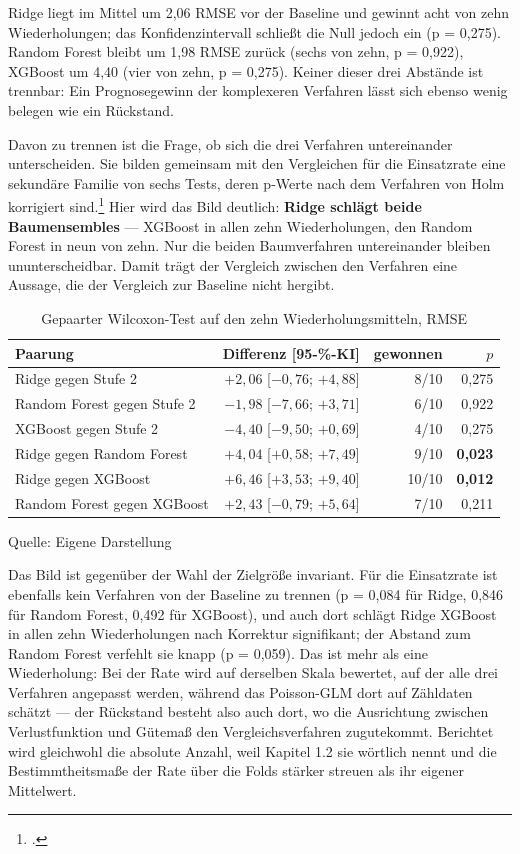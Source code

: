 \documentclass[12pt,a4paper]{article}
\renewcommand{\footnotesize}{\fontsize{10pt}{12pt}\selectfont}
\newcommand{\tabformat}{%
  \centering
  \singlespacing
  \footnotesize
  \setlength{\tabcolsep}{5pt}%
  \renewcommand{\arraystretch}{1.15}%
}
\newcommand{\tabquelle}[1][Eigene Darstellung]{%
  \par\setlength{\parskip}{0pt}\vspace{3pt}%
  {\setstretch{1}\fontsize{9pt}{11pt}\selectfont\raggedright Quelle: #1\par}%
}
\begin{document}
Ridge liegt im Mittel um 2,06 RMSE vor der Baseline und gewinnt acht von zehn Wiederholungen; das Konfidenzintervall schließt die Null jedoch ein (p = 0,275). Random Forest bleibt um 1,98 RMSE zurück (sechs von zehn, p = 0,922), XGBoost um 4,40 (vier von zehn, p = 0,275). Keiner dieser drei Abstände ist trennbar: Ein Prognosegewinn der komplexeren Verfahren lässt sich ebenso wenig belegen wie ein Rückstand.
 
Davon zu trennen ist die Frage, ob sich die drei Verfahren untereinander unterscheiden. Sie bilden gemeinsam mit den Vergleichen für die Einsatzrate eine sekundäre Familie von sechs Tests, deren p-Werte nach dem Verfahren von Holm korrigiert sind.\footcite[]{Holm1979} Hier wird das Bild deutlich: \textbf{Ridge schlägt beide Baumensembles} --- XGBoost in allen zehn Wiederholungen, den Random Forest in neun von zehn. Nur die beiden Baumverfahren untereinander bleiben ununterscheidbar. Damit trägt der Vergleich zwischen den Verfahren eine Aussage, die der Vergleich zur Baseline nicht hergibt.
 
 
\begin{table}[htbp]
\tabformat
\caption{Gepaarter Wilcoxon-Test auf den zehn Wiederholungsmitteln, RMSE}
\label{tab:regression-tests}
\begin{tabularx}{\textwidth}{@{}Y r r r@{}}
\toprule
\textbf{Paarung} & \textbf{Differenz [95-\%-KI]} & \textbf{gewonnen} & \textbf{$p$} \\
\midrule
Ridge gegen Stufe 2         & $+2{,}06$ [$-0{,}76$; $+4{,}88$] & 8/10 & 0,275 \\
Random Forest gegen Stufe 2 & $-1{,}98$ [$-7{,}66$; $+3{,}71$] & 6/10 & 0,922 \\
XGBoost gegen Stufe 2       & $-4{,}40$ [$-9{,}50$; $+0{,}69$] & 4/10 & 0,275 \\
\addlinespace
Ridge gegen Random Forest   & $+4{,}04$ [$+0{,}58$; $+7{,}49$] & 9/10 & \textbf{0,023} \\
Ridge gegen XGBoost         & $+6{,}46$ [$+3{,}53$; $+9{,}40$] & 10/10 & \textbf{0,012} \\
Random Forest gegen XGBoost & $+2{,}43$ [$-0{,}79$; $+5{,}64$] & 7/10 & 0,211 \\
\bottomrule
\end{tabularx}
\tabquelle
\end{table}
 
Das Bild ist gegenüber der Wahl der Zielgröße invariant. Für die Einsatzrate ist ebenfalls kein Verfahren von der Baseline zu trennen (p = 0,084 für Ridge, 0,846 für Random Forest, 0,492 für XGBoost), und auch dort schlägt Ridge XGBoost in allen zehn Wiederholungen nach Korrektur signifikant; der Abstand zum Random Forest verfehlt sie knapp (p = 0,059). Das ist mehr als eine Wiederholung: Bei der Rate wird auf derselben Skala bewertet, auf der alle drei Verfahren angepasst werden, während das Poisson-GLM dort auf Zähldaten schätzt --- der Rückstand besteht also auch dort, wo die Ausrichtung zwischen Verlustfunktion und Gütemaß den Vergleichsverfahren zugutekommt. Berichtet wird gleichwohl die absolute Anzahl, weil Kapitel 1.2 sie wörtlich nennt und die Bestimmtheitsmaße der Rate über die Folds stärker streuen als ihr eigener Mittelwert.
 
\end{document}
